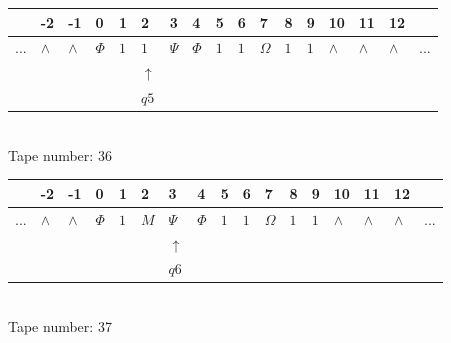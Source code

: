 \documentclass[11pt]{article}
\begin{document}
\begin{table}[H]
\centering
\begin{tabular}{lllllllllllllllll}
 & -2 & -1 & 0 & 1 & 2 & 3 & 4 & 5 & 6 & 7 & 8 & 9 & 10 & 11 & 12 & \\
\hline
$...$ & \multicolumn{1}{|l|}{$\wedge$} & \multicolumn{1}{|l|}{$\wedge$} & \multicolumn{1}{|l|}{$\Phi$} & \multicolumn{1}{|l|}{$1$} & \multicolumn{1}{|l|}{$1$} & \multicolumn{1}{|l|}{$\Psi$} & \multicolumn{1}{|l|}{$\Phi$} & \multicolumn{1}{|l|}{$1$} & \multicolumn{1}{|l|}{$1$} & \multicolumn{1}{|l|}{$\Omega$} & \multicolumn{1}{|l|}{$1$} & \multicolumn{1}{|l|}{$1$} & \multicolumn{1}{|l|}{$\wedge$} & \multicolumn{1}{|l|}{$\wedge$} & \multicolumn{1}{|l|}{$\wedge$} & $...$\\
\hline
&  &  &  &  & $\uparrow$ &  &  &  &  &  &  &  &  &  &  &  \\
&  &  &  &  & $ q5 $ &  &  &  &  &  &  &  &  &  &  &  \\
\end{tabular}
\\
Tape number: 36
\noindent\makebox[\linewidth]{\hdashrule{\textwidth}{1pt}{1pt}}\end{table}

\begin{table}[H]
\centering
\begin{tabular}{lllllllllllllllll}
 & -2 & -1 & 0 & 1 & 2 & 3 & 4 & 5 & 6 & 7 & 8 & 9 & 10 & 11 & 12 & \\
\hline
$...$ & \multicolumn{1}{|l|}{$\wedge$} & \multicolumn{1}{|l|}{$\wedge$} & \multicolumn{1}{|l|}{$\Phi$} & \multicolumn{1}{|l|}{$1$} & \multicolumn{1}{|l|}{$M$} & \multicolumn{1}{|l|}{$\Psi$} & \multicolumn{1}{|l|}{$\Phi$} & \multicolumn{1}{|l|}{$1$} & \multicolumn{1}{|l|}{$1$} & \multicolumn{1}{|l|}{$\Omega$} & \multicolumn{1}{|l|}{$1$} & \multicolumn{1}{|l|}{$1$} & \multicolumn{1}{|l|}{$\wedge$} & \multicolumn{1}{|l|}{$\wedge$} & \multicolumn{1}{|l|}{$\wedge$} & $...$\\
\hline
&  &  &  &  &  & $\uparrow$ &  &  &  &  &  &  &  &  &  &  \\
&  &  &  &  &  & $ q6 $ &  &  &  &  &  &  &  &  &  &  \\
\end{tabular}
\\
Tape number: 37
\noindent\makebox[\linewidth]{\hdashrule{\textwidth}{1pt}{1pt}}\end{table}
\end{document}
